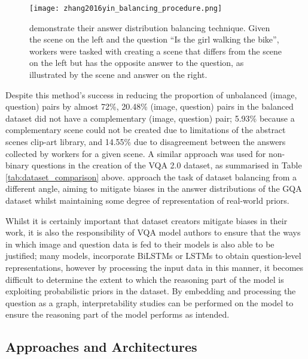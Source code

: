 \begin{figure}[H]
    \centering
    \texttt{[image: zhang2016yin\_balancing\_procedure.png]}
    \caption{\citeauthor{zhang2016yin} demonstrate their answer distribution balancing technique. Given the scene on the left and the question ``Is the girl walking the bike'', workers were tasked with creating a scene that differs from the scene on the left but has the opposite answer to the question, as illustrated by the scene and answer on the right.}
    \label{fig:zhang2016yin_balancing_procedure}
\end{figure}

Despite this method's success in reducing the proportion of unbalanced (image, question) pairs by almost 72\%, 20.48\% (image, question) pairs in the balanced dataset did not have a complementary (image, question) pair; 5.93\% because a complementary scene could not be created due to limitations of the abstract scenes clip-art library, and 14.55\% due to disagreement between the answers collected by workers for a given scene. A similar approach was used for non-binary questions in the creation of the VQA 2.0 dataset, as summarised in Table \ref{tab:dataset_comparison} above. \citeauthor{hudson2019gqa} approach the task of dataset balancing from a different angle, aiming to mitigate biases in the answer distributions of the GQA dataset whilst maintaining some degree of representation of real-world priors.

Whilst it is certainly important that dataset creators mitigate biases in their work, it is also the responsibility of VQA model authors to ensure that the ways in which image and question data is fed to their models is also able to be justified; many models,  incorporate BiLSTMs \cite{hudson2018compositional} or LSTMs \cite{andreas2016neural} to obtain question-level representations, however by processing the input data in this manner, it becomes difficult to determine the extent to which the reasoning part of the model is exploiting probabilistic priors in the dataset. By embedding and processing the question as a graph, interpretability studies can be performed on the model to ensure the reasoning part of the model performs as intended.

\subsection*{Approaches and Architectures}

